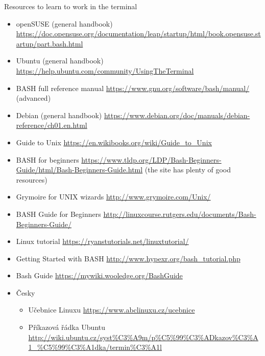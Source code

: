\documentclass[compress, ucs, xelatex, 11pt, xcolor=svgnames,
  hyperref={
    bookmarks=true,
    unicode=true,
    colorlinks=true,
    pdftitle={Linux, command line and MetaCentrum},
    plainpages=false,
    pdfauthor={Vojtech Zeisek},
    pdfsubject={Course about use of Linux command line, writing shell scripts and using MetaCentrum of CESNET},
    pdfcreator={XeLaTeX},
    pdfkeywords={Linux, GNU, BASH, shell, command line, MetaCentrum},
    linkcolor=DarkRed,
    anchorcolor=DarkBlue,
    citecolor=Indigo,
    filecolor=NavyBlue,
    menucolor=DarkMagenta,
    urlcolor=DarkBlue,
    pdftex},
  url={hyphens, lowtilde} %
  ]{beamer}
\begin{document}
\begin{frame}[allowframebreaks]{Resources to learn to work in the terminal}
  \begin{itemize}
    \item openSUSE (general handbook) \url{https://doc.opensuse.org/documentation/leap/startup/html/book.opensuse.startup/part.bash.html}
    \item Ubuntu (general handbook) \url{https://help.ubuntu.com/community/UsingTheTerminal}
    \item BASH full reference manual \url{https://www.gnu.org/software/bash/manual/} (advanced)
    \item Debian (general handbook) \url{https://www.debian.org/doc/manuals/debian-reference/ch01.en.html}
    \item Guide to Unix \url{https://en.wikibooks.org/wiki/Guide_to_Unix}
    \item BASH for beginners \url{https://www.tldp.org/LDP/Bash-Beginners-Guide/html/Bash-Beginners-Guide.html} (the site has plenty of good resources)
    \item Grymoire for UNIX wizards \url{http://www.grymoire.com/Unix/}
    \item BASH Guide for Beginners \url{http://linuxcourse.rutgers.edu/documents/Bash-Beginners-Guide/}
    \item Linux tutorial \url{https://ryanstutorials.net/linuxtutorial/}
    \item Getting Started with BASH \url{http://www.hypexr.org/bash_tutorial.php}
    \item Bash Guide \url{https://mywiki.wooledge.org/BashGuide}
    \item Česky
    \begin{itemize}
      \item Učebnice Linuxu \url{https://www.abclinuxu.cz/ucebnice}
      \item Příkazová řádka Ubuntu \url{http://wiki.ubuntu.cz/syst\%C3\%A9m/p\%C5\%99\%C3\%ADkazov\%C3\%A1_\%C5\%99\%C3\%A1dka/termin\%C3\%A1l}
    \end{itemize}
  \end{itemize}
\end{frame}
\end{document}

